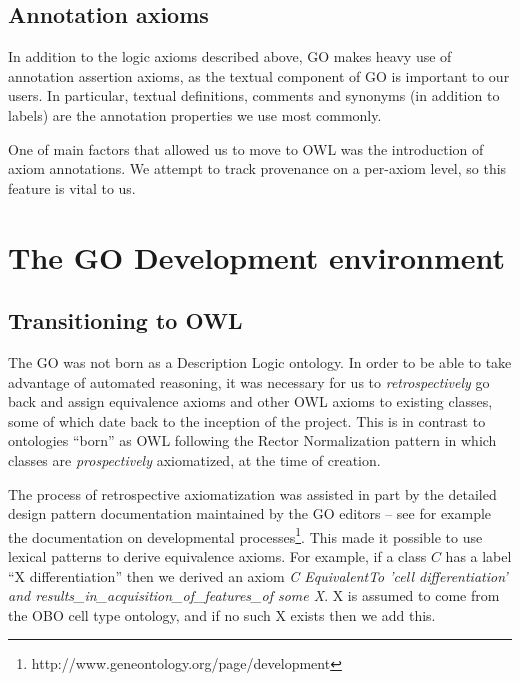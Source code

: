 \documentclass{llncs}
\begin{document}
\subsection{Annotation axioms}

In addition to the logic axioms described above, GO makes heavy use of
annotation assertion axioms, as the textual component of GO is
important to our users. In particular, textual definitions, comments
and synonyms (in addition to labels) are the annotation properties we
use most commonly.

One of main factors that allowed us to move to OWL was the
introduction of axiom annotations. We attempt to track provenance on a
per-axiom level, so this feature is vital to us.


\section{The GO Development environment}

\subsection{Transitioning to OWL}


The GO was not born as a Description Logic ontology. In order to be
able to take advantage of automated reasoning, it was necessary for us
to \emph{retrospectively} go back and assign equivalence axioms and
other OWL axioms to existing classes, some of which date back to the
inception of the project. This is in contrast to ontologies ``born''
as OWL following the Rector Normalization
pattern\cite{rector_modularisation_2003} in which classes are
\emph{prospectively} axiomatized, at the time of creation.

The process of retrospective axiomatization was assisted in part by
the detailed design pattern documentation maintained by the GO editors
-- see for example the documentation on developmental
processes\footnote{http://www.geneontology.org/page/development}. This
made it possible to use lexical patterns to derive equivalence
axioms\cite{Mungall2010GOXP}. For example, if a class $C$ has a label
``X differentiation'' then we derived an axiom \emph{C EquivalentTo
  'cell differentiation' and
  results\_in\_acquisition\_of\_features\_of some X}. X is assumed to
come from the OBO cell type ontology, and if no such X exists then we
add this.
\end{document}
